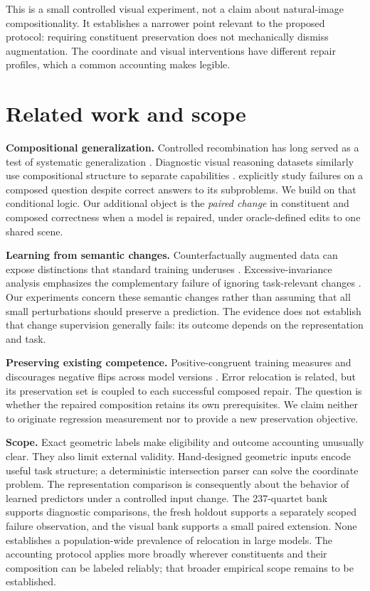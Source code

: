 This is a small controlled visual experiment, not a claim about natural-image compositionality. It establishes a narrower point relevant to the proposed protocol: requiring constituent preservation does not mechanically dismiss augmentation. The coordinate and visual interventions have different repair profiles, which a common accounting makes legible.

\hypertarget{related-work-and-scope}{%
\section{Related work and scope}\label{related-work-and-scope}}

\textbf{Compositional generalization.} Controlled recombination has long served as a test of systematic generalization \citep{lake2018generalization, keysers2020measuring}. Diagnostic visual reasoning datasets similarly use compositional structure to separate capabilities \citep{johnson2017clevr}. \citet{press2023measuring} explicitly study failures on a composed question despite correct answers to its subproblems. We build on that conditional logic. Our additional object is the \emph{paired change} in constituent and composed correctness when a model is repaired, under oracle-defined edits to one shared scene.

\textbf{Learning from semantic changes.} Counterfactually augmented data can expose distinctions that standard training underuses \citep{kaushik2020learning}. Excessive-invariance analysis emphasizes the complementary failure of ignoring task-relevant changes \citep{jacobsen2019excessive}. Our experiments concern these semantic changes rather than assuming that all small perturbations should preserve a prediction. The evidence does not establish that change supervision generally fails: its outcome depends on the representation and task.

\textbf{Preserving existing competence.} Positive-congruent training measures and discourages negative flips across model versions \citep{yan2021positive}. Error relocation is related, but its preservation set is coupled to each successful composed repair. The question is whether the repaired composition retains its own prerequisites. We claim neither to originate regression measurement nor to provide a new preservation objective.

\textbf{Scope.} Exact geometric labels make eligibility and outcome accounting unusually clear. They also limit external validity. Hand-designed geometric inputs encode useful task structure; a deterministic intersection parser can solve the coordinate problem. The representation comparison is consequently about the behavior of learned predictors under a controlled input change. The 237-quartet bank supports diagnostic comparisons, the fresh holdout supports a separately scoped failure observation, and the visual bank supports a small paired extension. None establishes a population-wide prevalence of relocation in large models. The accounting protocol applies more broadly wherever constituents and their composition can be labeled reliably; that broader empirical scope remains to be established.

